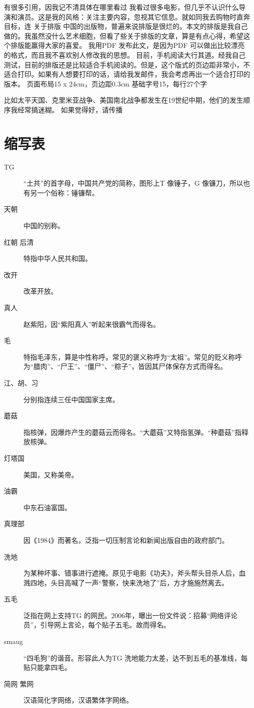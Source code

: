 有很多引用，因我记不清具体在哪里看过
我看过很多电影，但几乎不认识什么导演和演员。这是我的风格：关注主要内容，忽视其它信息。就如同我去购物时直奔目标，连
关于排版
中国的出版物，普遍来说排版是很烂的。本文的排版是我自己做的。我虽然没什么艺术细胞，但看了些关于排版的文章，算是有点心得，希望这个排版能赢得大家的喜爱。
我用PDF 发布此文，是因为PDF 可以做出比较漂亮的格式，而且我不喜欢别人修改我的思想。
目前，手机阅读大行其道。经我自己测试，目前的排版还是比较适合手机阅读的。但是，这个版式的页边距非常小，不适合打印。如果有人想要打印的话，请给我发邮件，我会考虑再出一个适合打印的版本。
页面布局15 x 24cm，页边距0.3cm
基础字号15，每行27个字

比如太平天国、克里米亚战争、美国南北战争都发生在19世纪中期，他们的发生顺序我经常搞迷糊。
如果觉得好，请传播

\chapter{缩写表}

\begin{description}
\item[TG] “土共”的首字母，中国共产党的简称，图形上T 像锤子，G 像镰刀，所以也有另一个俗称：锤镰帮。
\item[天朝] 中国的别称。
\item[红朝 后清] 特指中华人民共和国。
\item[改开] 改革开放。
\item[真人] 赵紫阳，因“紫阳真人”听起来很霸气而得名。
\item[毛] 特指毛泽东，算是中性称呼。常见的褒义称呼为“太祖”。常见的贬义称呼为“腊肉”、“尸王”、“僵尸”、“粽子”，皆因其尸体保存方式而得名。
\item[江、胡、习] 分别指连续三任中国国家主席。
\item[蘑菇] 指核弹，因爆炸产生的蘑菇云而得名。“大蘑菇”又特指氢弹。“种蘑菇”指释放核弹。
\item[灯塔国] 美国，又称美帝。
\item[油霸] 中东石油富国。
\item[真理部] 因《1984》而著名，泛指一切压制言论和新闻出版自由的政府部门。
\item[洗地] 为某种坏事、错事进行遮掩。原见于电影《功夫》，斧头帮头目杀人后，血溅四地，头目高喊了一声“警察，快来洗地了”后，方才施施然离去。
\item[五毛] 泛指在网上支持TG 的网民。2006年，曝出一份文件说：招募“网络评论员”，引导网上言论，每个贴子五毛。故而得名。
\item[smaug] “四毛狗”的谐音。形容此人为TG 洗地能力太差，达不到五毛的基准线，每贴只能拿四毛。
\item[简网 繁网] 汉语简化字网络，汉语繁体字网络。
\end{description}

